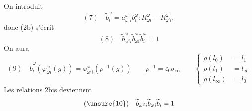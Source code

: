 On introduit
\[
(7)\quad\widetilde b_i^\omega=a_{\omega'i}^{\omega'}b_i^\omega:
R_{\omega i}^\omega\mathbin{-}R_{\omega'i}^\omega,
\]
donc (2b) s'écrit
\[
(8)\quad\widetilde b_{\omega^2i}^\omega\widetilde b_{\omega i}^\omega\widetilde b_i^\omega=1
\]
On aura
\[
(9)\quad\widetilde b_i^\omega(\varphi_{\omega i}^\omega(g))=\varphi_{\omega'i}^\omega(\rho^{-1}(g))
\qquad\rho^{-1}=\varepsilon_0\sigma_\infty
\qquad\left\{\begin{aligned}
\rho(l_0)&=l_1\\
\rho(l_1)&=l_\infty\\
\rho(l_\infty)&=l_0
\end{aligned}\right.
\]
Les relations 2bis deviennent
\[
(\unsure{10})\quad\widetilde b_{\omega^2i}\widetilde b_{\omega i}\widetilde b_i=1
\]

